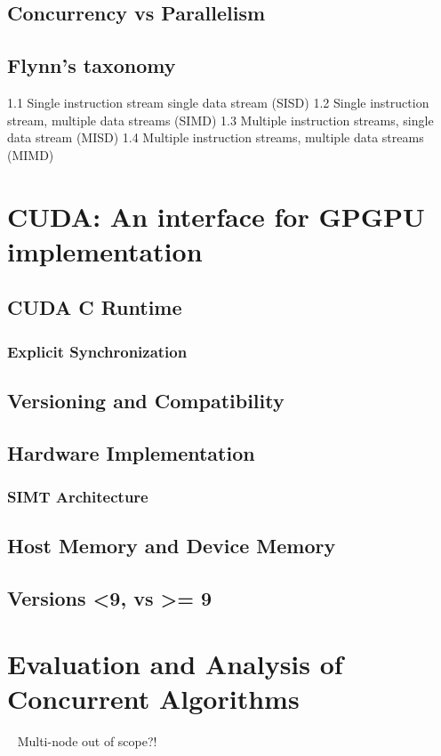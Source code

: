 \subsection{Concurrency vs Parallelism}
%
\subsection{Flynn's taxonomy}
1.1	Single instruction stream single data stream (SISD)
1.2	Single instruction stream, multiple data streams (SIMD)
1.3	Multiple instruction streams, single data stream (MISD)
1.4	Multiple instruction streams, multiple data streams (MIMD)
%
\section{CUDA: An interface for GPGPU implementation}
\subsection{CUDA C Runtime}%
\subsubsection{Explicit Synchronization}%
\subsection{Versioning and Compatibility}%
\subsection{Hardware Implementation}%
\subsubsection{SIMT Architecture}%
\subsection{Host Memory and Device Memory}
\subsection{Versions <9, vs >= 9}
%
%
%
%
%
\section{Evaluation and Analysis of Concurrent Algorithms}~\cite[p.~330]{Lang17}
Multi-node out of scope?!
%
